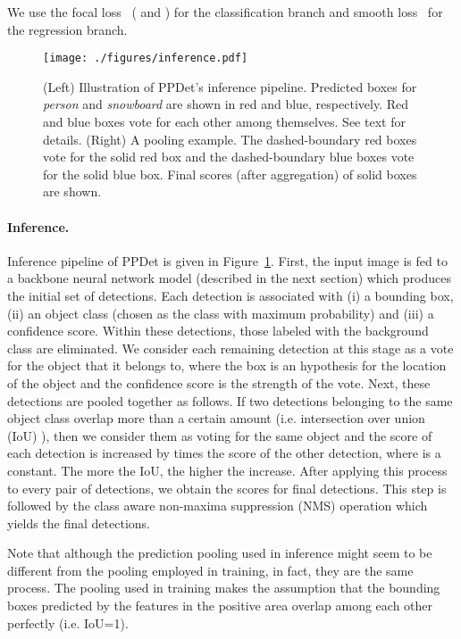 \documentclass{bmvc2k}
\begin{document}
We use the focal loss~\cite{retinanet} ( and ) for the classification branch and smooth  loss~\cite{fastrcnn} for the regression branch. 





\begin{figure}\texttt{[image: ./figures/inference.pdf]}
\caption{(Left) Illustration of PPDet’s inference pipeline. Predicted boxes for \textit{person} and \textit{snowboard} are shown in red and blue, respectively. Red and blue boxes vote for each other among themselves. See text for details. (Right) A pooling example. The dashed-boundary red boxes vote for the solid red box and the dashed-boundary blue boxes vote for the solid blue box. Final scores (after aggregation) of solid boxes are shown.}
\label{fig:inference}
\end{figure}




\paragraph{Inference.}  Inference pipeline of PPDet is given in Figure~\ref{fig:inference}. First, the input image is fed to a backbone neural network model (described in the next section) which produces the initial set of detections. Each detection is associated with (i) a bounding box, (ii) an object class (chosen as the class with maximum probability) and (iii) a confidence score. Within these detections, those labeled with the background class are eliminated. We consider each remaining detection at this stage as a vote for the object that it belongs to, where the box is an hypothesis for the location of the object and the confidence score is the strength of the vote. Next, these detections are pooled together  as follows. If two detections belonging to the same object class overlap more than a certain amount (i.e. intersection over union (IoU) ), then we consider them as voting for the same object and the score of each detection is increased by  times the score of the other detection, where  is a constant. The more the IoU, the higher the increase. After applying this process to every pair of detections, we obtain the scores for final detections. This step is followed by the class aware non-maxima suppression (NMS) operation which yields the final detections. 


Note that although the prediction pooling used in inference might seem to be different from the pooling employed in training, in fact, they are the same process. The pooling used in training makes the assumption that the bounding boxes predicted by the features in the positive area overlap among each other perfectly (i.e. IoU=1). 
\end{document}
